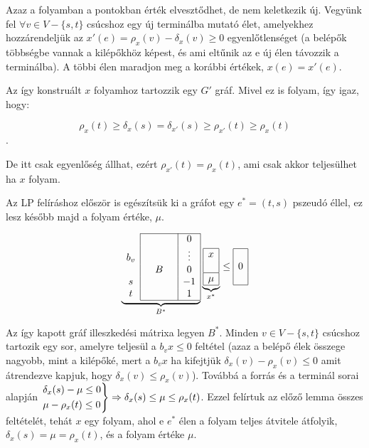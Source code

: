 Azaz a folyamban a pontokban érték elvesztődhet, de nem keletkezik új.
Vegyünk fel $\forall v \in V-\{s,t\}$ csúcshoz egy új terminálba mutató élet,
amelyekhez hozzárendeljük az $x'(e)=\rho_x(v)-\delta_x(v) \geq 0$
egyenlőtlenséget (a belépők többségbe vannak a kilépőkhöz képest, és ami
eltűnik az e új élen távozzik a terminálba). A többi élen maradjon meg a
korábbi értékek, $x(e)=x'(e)$.

Az így konstruált $x$ folyamhoz tartozzik egy $G'$ gráf.  Mivel ez is folyam,
így igaz, hogy:

\[\rho_{x}(t) \geq \delta_{x}(s) = \delta_{x'}(s) \geq \rho_{x'}(t) \geq 
\rho_{x}(t)\]. 

De itt csak egyenlőség állhat, ezért $\rho_{x'}(t)=\rho_{x}(t)$, ami csak akkor 
teljesülhet ha $x$ folyam.

Az LP felíráshoz először is egészítsük ki a gráfot egy $e^*=(t,s)$ pszeudó
éllel, ez lesz később majd a folyam értéke, $\mu$.

\begin{wrapfigure}{l}{0.35\textwidth}
\begin{center}
\vspace{-1.3cm}
\begin{displaymath}
\underbrace{
\begin{array}{c|ccc|c|}
\cline{2-5}
&  & & &0 \\
b_v&  & & & \vdots \\
&  & B& & 0\\
s &   & & &-1 \\
t &   & & & 1 \\
\cline{2-5}
\end{array}}_{B^*}
\underbrace{
\begin{array}{|c|}
\hline
x\\
\\
\hline
\mu\\
\hline
\end{array}}_{x^*}
\leq
\begin{array}{|c|}
\hline
\\
0\\
\\
\hline
\end{array}
\end{displaymath}
\vspace{-1.3cm}
\end{center}
\end{wrapfigure}	
Az így kapott gráf illeszkedési mátrixa legyen $B^*$. Minden $v \in V - \{s,t\}$
csúcshoz tartozik egy sor, amelyre teljesül a $b_vx\leq 0$ feltétel (azaz a
belépő élek összege nagyobb, mint a kilépőké, mert a $b_vx$ ha kifejtjük
$\delta_x(v) - \rho_x(v) \leq 0 $ amit átrendezve kapjuk, hogy $ \delta_x(v)
\leq \rho_x(v)$).
Továbbá a forrás és a terminál sorai alapján $\begin{rcases} \delta_x(s)-\mu
\leq 0 \\
\mu - \rho_x(t) \leq 0 \end{rcases} \Rightarrow \delta_x(s) \leq \mu \leq
\rho_x(t)$. Ezzel felírtuk az előző lemma összes feltételét, tehát $x$ egy
folyam, ahol e $e^*$ élen a folyam teljes átvitele átfolyik,
$\delta_x(s)=\mu=\rho_x(t)$, és a folyam értéke $\mu$.

